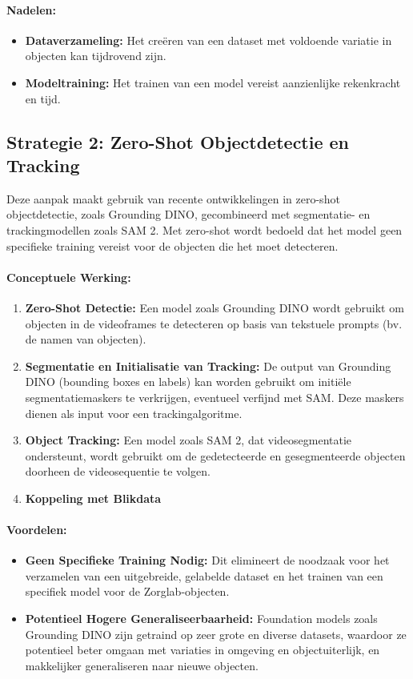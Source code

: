 \paragraph{Nadelen:}
\begin{itemize}
    \item \textbf{Dataverzameling:} Het creëren van een dataset met voldoende variatie in objecten kan tijdrovend zijn.
    \item \textbf{Modeltraining:} Het trainen van een model vereist aanzienlijke rekenkracht en tijd.
\end{itemize}

\subsection{Strategie 2: Zero-Shot Objectdetectie en Tracking}

Deze aanpak maakt gebruik van recente ontwikkelingen in zero-shot objectdetectie, zoals Grounding DINO, gecombineerd met segmentatie- en trackingmodellen zoals SAM 2.
Met zero-shot wordt bedoeld dat het model geen specifieke training vereist voor de objecten die het moet detecteren.

\paragraph{Conceptuele Werking:}
\begin{enumerate}
    \item \textbf{Zero-Shot Detectie:} Een model zoals Grounding DINO wordt gebruikt om objecten in de videoframes te detecteren op basis van tekstuele prompts (bv. de namen van objecten).
    \item \textbf{Segmentatie en Initialisatie van Tracking:} De output van Grounding DINO (bounding boxes en labels) kan worden gebruikt om initiële segmentatiemaskers te verkrijgen, eventueel verfijnd met SAM. Deze maskers dienen als input voor een trackingalgoritme.
    \item \textbf{Object Tracking:} Een model zoals SAM 2, dat videosegmentatie ondersteunt, wordt gebruikt om de gedetecteerde en gesegmenteerde objecten doorheen de videosequentie te volgen.
    \item \textbf{Koppeling met Blikdata}
\end{enumerate}

\paragraph{Voordelen:}
\begin{itemize}
    \item \textbf{Geen Specifieke Training Nodig:} Dit elimineert de noodzaak voor het verzamelen van een uitgebreide, gelabelde dataset en het trainen van een specifiek model voor de Zorglab-objecten.
    \item \textbf{Potentieel Hogere Generaliseerbaarheid:} Foundation models zoals Grounding DINO zijn getraind op zeer grote en diverse datasets, waardoor ze potentieel beter omgaan met variaties in omgeving en object\-uiterlijk, en makkelijker generaliseren naar nieuwe objecten.
\end{itemize}

